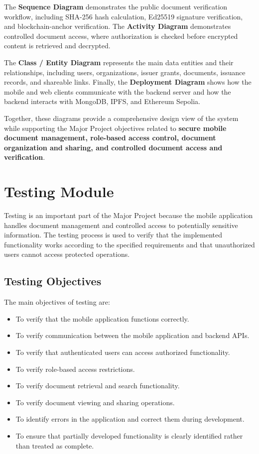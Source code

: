 \documentclass[12pt]{article}
\begin{document}
The \textbf{Sequence Diagram} demonstrates the public document verification workflow, including SHA-256 hash calculation, Ed25519 signature verification, and blockchain-anchor verification. The \textbf{Activity Diagram} demonstrates controlled document access, where authorization is checked before encrypted content is retrieved and decrypted.

The \textbf{Class / Entity Diagram} represents the main data entities and their relationships, including users, organizations, issuer grants, documents, issuance records, and shareable links. Finally, the \textbf{Deployment Diagram} shows how the mobile and web clients communicate with the backend server and how the backend interacts with MongoDB, IPFS, and Ethereum Sepolia.

Together, these diagrams provide a comprehensive design view of the system while supporting the Major Project objectives related to \textbf{secure mobile document management, role-based access control, document organization and sharing, and controlled document access and verification}.


\newpage

\section{Testing Module}

Testing is an important part of the Major Project because the mobile application handles document management and controlled access to potentially sensitive information. The testing process is used to verify that the implemented functionality works according to the specified requirements and that unauthorized users cannot access protected operations.



\subsection{Testing Objectives}

The main objectives of testing are:

\begin{itemize}
    \item To verify that the mobile application functions correctly.
    \item To verify communication between the mobile application and backend APIs.
    \item To verify that authenticated users can access authorized functionality.
    \item To verify role-based access restrictions.
    \item To verify document retrieval and search functionality.
    \item To verify document viewing and sharing operations.
    \item To identify errors in the application and correct them during development.
    \item To ensure that partially developed functionality is clearly identified rather than treated as complete.
\end{itemize}
\end{document}
